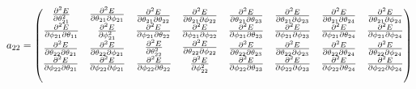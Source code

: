 \documentclass[9pt]{article}
\begin{document}
\begin{equation*}
	a_{22} = 
	\begin{pmatrix}
		\begin{matrix} 
			\pdv[2]{E}{\theta_{21}} & \pdv{E}{\theta_{21}}{\phi_{21}} \\
			\pdv{E}{\phi_{21}}{\theta_{11}} & \pdv[2]{E}{\phi_{21}}
		\end{matrix}& 	
		\begin{matrix} 
			\pdv{E}{\theta_{21}}{\theta_{22}} & \pdv{E}{\theta_{21}}{\phi_{22}} \\
			\pdv{E}{\phi_{21}}{\theta_{22}} & \pdv{E}{\phi_{21}}{\phi_{22}} 
		\end{matrix}& 
		\begin{matrix} 
			\pdv{E}{\theta_{21}}{\theta_{23}} & \pdv{E}{\theta_{21}}{\phi_{23}} \\
			\pdv{E}{\phi_{21}}{\theta_{23}} & \pdv{E}{\phi_{21}}{\phi_{23}} 
		\end{matrix}&
		\begin{matrix} 
			\pdv{E}{\theta_{21}}{\theta_{24}} & \pdv{E}{\theta_{21}}{\phi_{24}} \\
			\pdv{E}{\phi_{21}}{\theta_{24}} & \pdv{E}{\phi_{21}}{\phi_{24}} 
		\end{matrix}\\
		\begin{matrix} 
			\pdv{E}{\theta_{22}}{\theta_{21}} & \pdv{E}{\theta_{22}}{\phi_{21}} \\
			\pdv{E}{\phi_{22}}{\theta_{21}} & \pdv{E}{\phi_{22}}{\phi_{21}} 
		\end{matrix} & 
		\begin{matrix} 
			\pdv[2]{E}{\theta_{22}} & \pdv{E}{\theta_{22}}{\phi_{22}} \\
			\pdv{E}{\phi_{22}}{\theta_{22}} & \pdv[2]{E}{\phi_{22}} 
		\end{matrix}&
		\begin{matrix} 
			\pdv{E}{\theta_{22}}{\theta_{23}} & \pdv{E}{\theta_{22}}{\phi_{23}} \\
			\pdv{E}{\phi_{22}}{\theta_{23}} & \pdv{E}{\phi_{22}}{\phi_{23}} 
		\end{matrix}&
		\begin{matrix} 
			\pdv{E}{\theta_{22}}{\theta_{24}} & \pdv{E}{\theta_{22}}{\phi_{24}} \\
			\pdv{E}{\phi_{22}}{\theta_{24}} & \pdv{E}{\phi_{22}}{\phi_{24}} 
		\end{matrix}\\
		\begin{matrix} 

\end{matrix}
\end{pmatrix}
\end{equation*}
\end{document}
